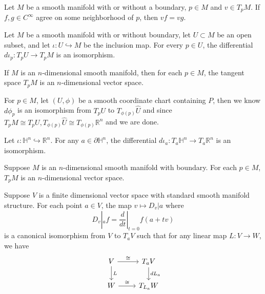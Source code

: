 \begin{proposition}
    Let $M$ be a smooth manifold with or without a boundary, $p\in M$ and $v\in T_pM$. If $f,g\in C^{\infty}$ agree on some neighborhood of $p$, then $vf = vg$.
\end{proposition}

\begin{proposition}
    Let $M$ be a smooth manifold with or without boundary, let $U\subset M$ be an open subset, and let $\iota:U\hookrightarrow M$ be the inclusion map. For every $p\in U$, the differential $d\iota_p:T_p U \to T_p M$ is an isomorphism.
\end{proposition}

\begin{proposition}
    If $M$ is an $n$-dimensional smooth manifold, then for each $p\in M$, the tangent space $T_pM$ is an $n$-dimensional vector space.
\end{proposition}
\Pf\par
For $p\in M$, let $(U,\phi)$ be a smooth coordinate chart containing $P$, then we know $d\phi_p$ is an isomorphism from $T_pU$ to $T_{\phi(p)}\hat{U}$ and since $T_pM\cong T_pU, T_{\phi(p)}\hat{U}\cong T_{\phi(p)}\mathbb{R}^n$ and we are done.

\begin{lemma}
    Let $\iota:\mathbb{H}^n\hookrightarrow\mathbb{R}^n$. For any $a\in \partial\mathbb{H}^n$, the differential $d\iota_a:T_a\mathbb{H}^n \to T_a\mathbb{R}^n$ is an isomorphism.
\end{lemma}

\begin{proposition}
    Suppose $M$ is an $n$-dimensional smooth manifold with boundary. For each $p\in M$,$T_pM$ is an $n$-dimensional vector space.
\end{proposition}

\begin{proposition}
    Suppose $V$ is a finite dimensional vector space with standard smooth manifold structure. For each point $a\in V$, the map $v\mapsto D_v|a$ where
    \[D_v|_a f = \dfrac{d}{dt}|_{t=0}f(a+tv)\]
    is a canonical isomorphism from $V$ to $T_aV$ such that for any linear map $L:V\to W$, we have
    \[
    \begin{tikzcd}
    V\arrow[r, "\cong"]\arrow[d,"L"] & T_aV\arrow[d, "dL_a"]\\
    W\arrow[r,"\cong"] & T_{L_a}W\\
    \end{tikzcd}
    \]
\end{proposition}

